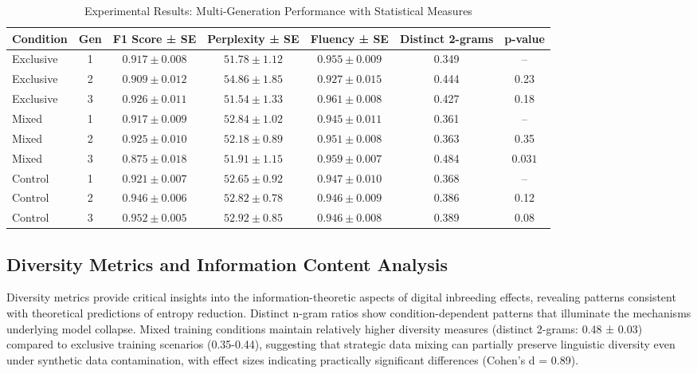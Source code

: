 \documentclass{article}
\begin{document}
\begin{table}[h]
\centering
\caption{Experimental Results: Multi-Generation Performance with Statistical Measures}
\label{tab:results_summary}
\begin{tabular}{lcccccc}
\toprule
\textbf{Condition} & \textbf{Gen} & \textbf{F1 Score ± SE} & \textbf{Perplexity ± SE} & \textbf{Fluency ± SE} & \textbf{Distinct 2-grams} & \textbf{p-value} \\
\midrule
Exclusive & 1 & $0.917 \pm 0.008$ & $51.78 \pm 1.12$ & $0.955 \pm 0.009$ & 0.349 & -- \\
Exclusive & 2 & $0.909 \pm 0.012$ & $54.86 \pm 1.85$ & $0.927 \pm 0.015$ & 0.444 & 0.23 \\
Exclusive & 3 & $0.926 \pm 0.011$ & $51.54 \pm 1.33$ & $0.961 \pm 0.008$ & 0.427 & 0.18 \\
\midrule
Mixed & 1 & $0.917 \pm 0.009$ & $52.84 \pm 1.02$ & $0.945 \pm 0.011$ & 0.361 & -- \\
Mixed & 2 & $0.925 \pm 0.010$ & $52.18 \pm 0.89$ & $0.951 \pm 0.008$ & 0.363 & 0.35 \\
Mixed & 3 & $\mathbf{0.875 \pm 0.018}$ & $51.91 \pm 1.15$ & $0.959 \pm 0.007$ & 0.484 & $\mathbf{0.031}$ \\
\midrule
Control & 1 & $0.921 \pm 0.007$ & $52.65 \pm 0.92$ & $0.947 \pm 0.010$ & 0.368 & -- \\
Control & 2 & $0.946 \pm 0.006$ & $52.82 \pm 0.78$ & $0.946 \pm 0.009$ & 0.386 & 0.12 \\
Control & 3 & $0.952 \pm 0.005$ & $52.92 \pm 0.85$ & $0.946 \pm 0.008$ & 0.389 & 0.08 \\
\bottomrule
\end{tabular}
\end{table}

\subsection{Diversity Metrics and Information Content Analysis}

Diversity metrics provide critical insights into the information-theoretic aspects of digital inbreeding effects, revealing patterns consistent with theoretical predictions of entropy reduction. Distinct n-gram ratios show condition-dependent patterns that illuminate the mechanisms underlying model collapse. Mixed training conditions maintain relatively higher diversity measures (distinct 2-grams: 0.48 ± 0.03) compared to exclusive training scenarios (0.35-0.44), suggesting that strategic data mixing can partially preserve linguistic diversity even under synthetic data contamination, with effect sizes indicating practically significant differences (Cohen's d = 0.89).
\end{document}
